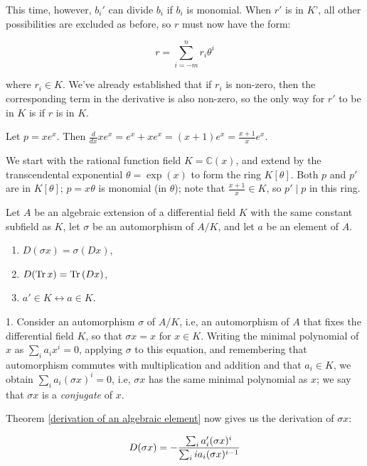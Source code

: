 This time, however, $b_i'$ can divide $b_i$ if $b_i$ is monomial.
When $r'$ is in $K$', all other possibilities are excluded as before,
so $r$ must now have the form:

$$r = \sum_{i=-m}^n r_i \theta^i$$

where $r_i \in K$.  We've already established that if $r_i$ is
non-zero, then the corresponding term in the derivative
is also non-zero, so the only way for $r'$ to be in $K$ is if
$r$ is in $K$.

\endtheorem

\example Let $p = x e^x$.  Then
$\frac{d}{dx} x e^x = e^x + x e^x = (x+1) e^x = \frac{x+1}{x} e^x$.

We start with the rational function field $K = {\mathbb C}(x)$, and
extend by the transcendental exponential $\theta = \exp(x)$ to form
the ring $K[\theta]$.  Both $p$ and $p'$ are in $K[\theta]$;
$p=x\theta$ is monomial (in $\theta$); note that $\frac{x+1}{x} \in
K$, so $p' \mid p$ in this ring.

\endexample

\theorem\label{basic algebraic properties}

Let $A$ be an algebraic extension of a differential field $K$ with the
same constant subfield as $K$, let $\sigma$ be an automorphism of
$A/K$, and let $a$ be an element of $A$.

\begin{enumerate}
\item $D(\sigma x) = \sigma(D x)$,
\item $D({\rm Tr\,} x) = {\rm Tr\,}(D x)$,
\item $a' \in K \leftrightarrow a \in K$.
\end{enumerate}

\proof

1. Consider an automorphism $\sigma$ of $A/K$, i.e, an automorphism of $A$
that fixes the differential field $K$, so that $\sigma x = x$ for
$x \in K$.  Writing the minimal polynomial of $x$ as $\sum_i a_i x^i =
0$, applying $\sigma$ to this equation, and remembering that
automorphism commutes with multiplication and addition and that
$a_i \in K$, we obtain $\sum_i a_i (\sigma x)^i = 0$, i.e, $\sigma x$
has the same minimal polynomial as $x$; we say that $\sigma x$
is a {\it conjugate} of $x$.

Theorem \ref{derivation of an algebraic element} now gives us the derivation of $\sigma x$:

$$D(\sigma x) = - {\sum_i a_i' (\sigma x)^i \over {\sum_i i a_i (\sigma x)^{i-1}}} $$

